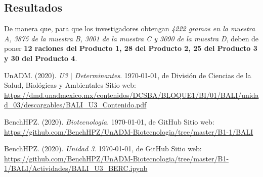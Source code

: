 \documentclass[12pt, landscape]{article}
\begin{document}
\subsection*{Resultados}

	\par De manera que, para que los investigadores obtengan \textit{4222 gramos en la muestra A, 3875 de la muestra B, 3001 de la muestra C y 3090 de la muestra D}, deben de poner \textbf{12 raciones del Producto 1, 28 del Producto 2, 25 del Producto 3 y 30 del Producto 4}.
	
	


\newpage
\begin{thebibliography}{X}

	 UnADM. (2020). \textit{U3 $|$ Determinantes}. \today, de División de Ciencias de la Salud, Biológicas y Ambientales Sitio web: \url{https://dmd.unadmexico.mx/contenidos/DCSBA/BLOQUE1/BI/01/BALI/unidad_03/descargables/BALI_U3_Contenido.pdf}
	
	BenchHPZ. (2020). \textit{Biotecnolog\'ia}. \today, de GitHub Sitio web: \url{https://github.com/BenchHPZ/UnADM-Biotecnologia/tree/master/B1-1/BALI}
	
	 BenchHPZ. (2020). \textit{Unidad 3}. \today, de GitHub Sitio web: \url{https://github.com/BenchHPZ/UnADM-Biotecnologia/tree/master/B1-1/BALI/Actividades/BALI_U3_BERC.ipynb}
\end{thebibliography}
\end{document}
